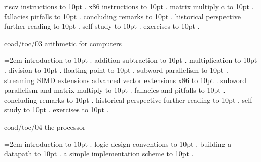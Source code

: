  riscv instructions \leaders\hbox to 10pt {\hss.\hss}  \hfill {}
 x86 instructions \leaders\hbox to 10pt {\hss.\hss}  \hfill {}
 matrix multiply c \leaders\hbox to 10pt {\hss.\hss}  \hfill {}
 fallacies pitfalls \leaders\hbox to 10pt {\hss.\hss}  \hfill {}
 concluding remarks \leaders\hbox to 10pt {\hss.\hss}  \hfill {}
 historical perspective further reading \leaders\hbox to 10pt {\hss.\hss}  \hfill {}
 self study \leaders\hbox to 10pt {\hss.\hss}  \hfill {}
 exercises \leaders\hbox to 10pt {\hss.\hss}  \hfill {}
\smallskip
\par\endgroup
\bigskip
{}
coad/toc/03 arithmetic for computers
\par\begingroup
\leftskip=2em
\smallskip
{} introduction \leaders\hbox to 10pt {\hss.\hss}  \hfill {}
 addition subtraction \leaders\hbox to 10pt {\hss.\hss}  \hfill {}
 multiplication \leaders\hbox to 10pt {\hss.\hss}  \hfill {}
 division \leaders\hbox to 10pt {\hss.\hss}  \hfill {}
 floating point \leaders\hbox to 10pt {\hss.\hss}  \hfill {}
 subword parallelism \leaders\hbox to 10pt {\hss.\hss}  \hfill {}
 streaming SIMD extensions advanced vector extensions x86 \leaders\hbox to 10pt {\hss.\hss}  \hfill {}
 subword parallelism and matrix multiply \leaders\hbox to 10pt {\hss.\hss}  \hfill {}
 fallacies and pitfalls \leaders\hbox to 10pt {\hss.\hss}  \hfill {}
 concluding remarks \leaders\hbox to 10pt {\hss.\hss}  \hfill {}
 historical perspective further reading \leaders\hbox to 10pt {\hss.\hss}  \hfill {}
 self study \leaders\hbox to 10pt {\hss.\hss}  \hfill {}
 exercises \leaders\hbox to 10pt {\hss.\hss}  \hfill {}
\smallskip
\par\endgroup
\bigskip
{}
coad/toc/04 the processor
\par\begingroup
\leftskip=2em
\smallskip
{} introduction \leaders\hbox to 10pt {\hss.\hss}  \hfill {}
 logic design conventions \leaders\hbox to 10pt {\hss.\hss}  \hfill {}
 building a datapath \leaders\hbox to 10pt {\hss.\hss}  \hfill {}
 a simple implementation scheme \leaders\hbox to 10pt {\hss.\hss}  \hfill {}

